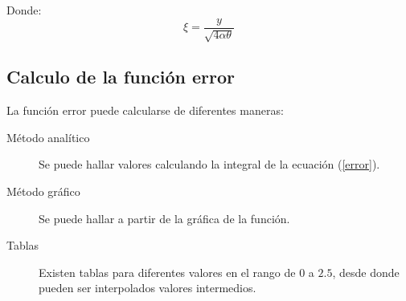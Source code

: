 Donde:
\begin{equation}
    \xi = \frac{y}{\sqrt{4\alpha\theta}}
\end{equation}

\subsection{Calculo de la función error}
La función error puede calcularse de diferentes maneras:

\begin{description}
    \item [Método analítico] Se puede hallar valores calculando la integral de
        la ecuación (\ref{error}).
    \item [Método gráfico] Se puede hallar a partir de la gráfica de la
        función.
    \item [Tablas] Existen tablas para diferentes valores en el rango de $0$ a
        $2.5$, desde donde pueden ser interpolados valores intermedios.
\end{description}

